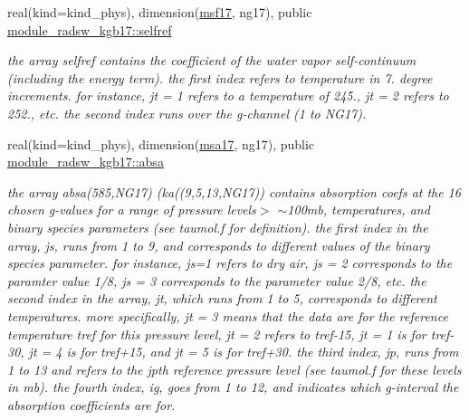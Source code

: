 \begin{DoxyCompactItemize}
real(kind=kind\+\_\+phys), dimension(\hyperlink{group__module__radsw__kgbnn_ga6864c3b95515fb2f408e21298da3952f}{msf17}, ng17), public \hyperlink{group__module__radsw__kgbnn_gaade34dfbe8c5f380088b6e03acc727c9}{module\+\_\+radsw\+\_\+kgb17\+::selfref}
\begin{DoxyCompactList}\small\item\em the array selfref contains the coefficient of the water vapor self-\/continuum (including the energy term). the first index refers to temperature in 7. degree increments. for instance, jt = 1 refers to a temperature of 245., jt = 2 refers to 252., etc. the second index runs over the g-\/channel (1 to N\+G17). \end{DoxyCompactList}\item 
\mbox{\label{group__module__radsw__kgbnn_ga19083764c3dfe437282b032517baf3ed}} 
real(kind=kind\+\_\+phys), dimension(\hyperlink{namespacemodule__radsw__kgb17_ac139ff93555c22e658cb767fa7142e08}{msa17}, ng17), public \hyperlink{group__module__radsw__kgbnn_ga19083764c3dfe437282b032517baf3ed}{module\+\_\+radsw\+\_\+kgb17\+::absa}
\begin{DoxyCompactList}\small\item\em the array absa(585,\+N\+G17) (ka((9,5,13,\+N\+G17)) contains absorption coefs at the 16 chosen g-\/values for a range of pressure levels$>$ $\sim$100mb, temperatures, and binary species parameters (see taumol.\+f for definition). the first index in the array, js, runs from 1 to 9, and corresponds to different values of the binary species parameter. for instance, js=1 refers to dry air, js = 2 corresponds to the paramter value 1/8, js = 3 corresponds to the parameter value 2/8, etc. the second index in the array, jt, which runs from 1 to 5, corresponds to different temperatures. more specifically, jt = 3 means that the data are for the reference temperature tref for this pressure level, jt = 2 refers to tref-\/15, jt = 1 is for tref-\/30, jt = 4 is for tref+15, and jt = 5 is for tref+30. the third index, jp, runs from 1 to 13 and refers to the jpth reference pressure level (see taumol.\+f for these levels in mb). the fourth index, ig, goes from 1 to 12, and indicates which g-\/interval the absorption coefficients are for. \end{DoxyCompactList}\item 
\mbox{\label{group__module__radsw__kgbnn_gaef407d13a88f5e1bfd20652ab3010e2f}} 

\end{DoxyCompactItemize}
